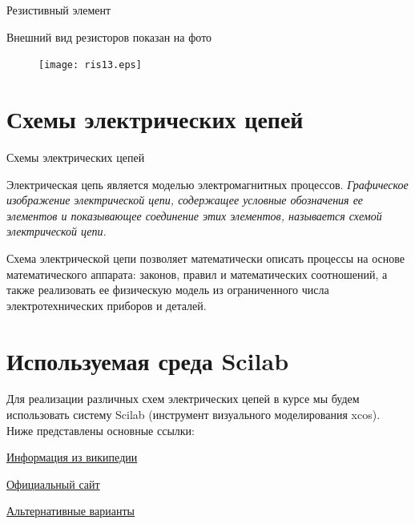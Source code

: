 \documentclass[12pt, pdf, hyperref={unicode},handout]{beamer}
\begin{document}
\begin{frame}{Резистивный элемент}
  \begin{block}

    \small{
Внешний вид резисторов показан на фото
  \begin{figure}[htb] 
    \centering
    \texttt{[image: ris13.eps]}
  \end{figure}
}

  \end{block}
  
\end{frame}

\section{Схемы электрических цепей}
\begin{frame}{Схемы электрических цепей}
  \begin{block}

    \small{
      Электрическая цепь является моделью электромагнитных процессов.
      \textit{Графическое изображение электрической цепи, содержащее условные обозначения ее элементов и показывающее соединение этих элементов, называется схемой электрической цепи.}

      Схема электрической цепи позволяет математически описать процессы на основе математического аппарата: законов, правил и математических соотношений, а также реализовать ее физическую модель из ограниченного числа электротехнических приборов и деталей. 
}

  \end{block}
  
\end{frame}



\section{Используемая среда Scilab}
\begin{frame}{}
  \begin{block}

    \small{
      Для реализации различных схем электрических цепей в курсе мы будем использовать систему Scilab (инструмент визуального моделирования xcos). Ниже представлены основные ссылки:
      
      \href{https://ru.wikipedia.org/wiki/Scilab}{Информация из википедии}

      \href{https://www.scilab.org/}{Официальный сайт}

      \href{https://online-electric.ru/virtlab.php}{Альтернативные варианты}
      
}

  \end{block}
  
\end{frame}
\end{document}
